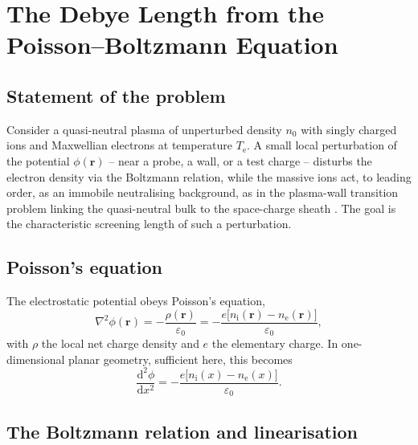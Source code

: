 \section{The Debye Length from the Poisson--Boltzmann Equation}
\label{appA-sec:debye}

\subsection{Statement of the problem}

Consider a quasi-neutral plasma of unperturbed density $n_{0}$ with singly charged ions and Maxwellian electrons at temperature $T_{\mathrm{e}}$. A small local perturbation of the potential $\phi(\mathbf{r})$ -- near a probe, a wall, or a test charge -- disturbs the electron density via the Boltzmann relation, while the massive ions act, to leading order, as an immobile neutralising background, as in the plasma-wall transition problem linking the quasi-neutral bulk to the space-charge sheath \cite{ref0013}. The goal is the characteristic screening length of such a perturbation.

\subsection{Poisson's equation}

The electrostatic potential obeys Poisson's equation,
\begin{equation}
\nabla^{2}\phi(\mathbf{r}) = -\frac{\rho(\mathbf{r})}{\varepsilon_{0}} = -\frac{e\big[n_{\mathrm{i}}(\mathbf{r}) - n_{\mathrm{e}}(\mathbf{r})\big]}{\varepsilon_{0}},
\label{eq:poisson0}
\end{equation}
with $\rho$ the local net charge density and $e$ the elementary charge. In one-dimensional planar geometry, sufficient here, this becomes
\begin{equation}
\frac{\mathrm{d}^{2}\phi}{\mathrm{d}x^{2}} = -\frac{e\big[n_{\mathrm{i}}(x) - n_{\mathrm{e}}(x)\big]}{\varepsilon_{0}}.
\label{eq:poisson1d}
\end{equation}

\subsection{The Boltzmann relation and linearisation}

